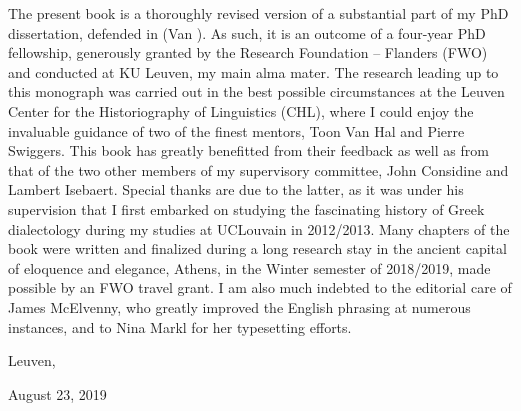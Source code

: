 \addchap{\lsAcknowledgementTitle} 
 
The present book is a thoroughly revised version of a substantial part of my PhD dissertation, defended in \citealt{May2017} (Van \citealt{Rooy2017}). As such, it is an outcome of a four-year PhD fellowship, generously granted by the Research Foundation – Flanders (FWO) and conducted at KU Leuven, my main alma mater. The research leading up to this monograph was carried out in the best possible circumstances at the Leuven Center for the Historiography of Linguistics (CHL), where I could enjoy the invaluable guidance of two of the finest mentors, Toon Van Hal and Pierre Swiggers. This book has greatly benefitted from their feedback as well as from that of the two other members of my supervisory committee, John Considine and Lambert Isebaert. Special thanks are due to the latter, as it was under his supervision that I first embarked on studying the fascinating history of Greek dialectology during my studies at UCLouvain in 2012/2013. Many chapters of the book were written and finalized during a long research stay in the ancient capital of eloquence and elegance, Athens, in the Winter semester of 2018/2019, made possible by an FWO travel grant. I am also much indebted to the editorial care of James McElvenny, who greatly improved the English phrasing at numerous instances, and to Nina Markl for her typesetting efforts.

Leuven,

August 23, 2019


